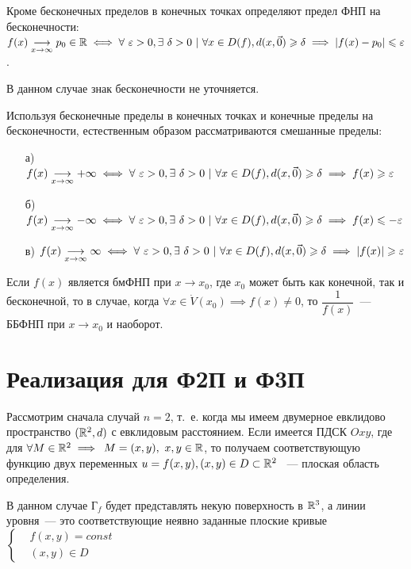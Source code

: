 \documentclass[../../main.tex]{subfiles}
\begin{document}
Кроме бесконечных пределов в конечных точках определяют предел ФНП
на бесконечности: $f(x)\underset{x \to \infty}{\longrightarrow}
p_0 \in \R \iff
\forall\ \eps > 0, \exists\ \delta > 0\ |\ 
\forall x \in D(f), d(x, \vec{0}) \geq \delta
\implies |f(x) - p_0| \leq \eps$.

В данном случае знак бесконечности не уточняется.

Используя бесконечные пределы в конечных точках и 
конечные пределы на бесконечности,
естественным образом рассматриваются смешанные пределы:

\begin{itemize}
	\item[а)] $f(x)\underset{x \to \infty}{\longrightarrow} +\infty \iff
	\forall\ \eps > 0, \exists\ \delta > 0\ |\ 
	\forall x \in D(f), d(x, \vec{0}) \geq \delta
	\implies f(x) \geq \eps$
	\item[б)] $f(x)\underset{x \to \infty}{\longrightarrow} -\infty \iff
	\forall\ \eps > 0, \exists\ \delta > 0\ |\ 
	\forall x \in D(f), d(x, \vec{0}) \geq \delta
	\implies f(x) \leq -\eps$
	\item[в)] $f(x)\underset{x \to \infty}{\longrightarrow} \infty \iff
	\forall\ \eps > 0, \exists\ \delta > 0\ |\ 
	\forall x \in D(f), d(x, \vec{0}) \geq \delta
	\implies |f(x)| \geq \eps$
\end{itemize}
	
Если $f(x)$ является бмФНП при $x \to x_0$, где $x_0$ может быть как конечной,
так и бесконечной, то в случае, когда $\forall x \in \dot{V}{(x_0)} \implies
f(x) \ne 0$, то $\dfrac{1}{f(x)}$~--- ББФНП при $x \to x_0$ и наоборот.
	
\section{Реализация для Ф2П и Ф3П}	

Рассмотрим сначала случай $n=2$, т.~е. когда мы имеем двумерное евклидово
пространство $(\mathbb{R}^2, d)$ с евклидовым расстоянием. Если 
имеется ПДСК $Oxy$, где для
$\forall M \in \mathbb{R}^2 \implies$
$M = (x, y),\ x, y \in \mathbb{R}$, то получаем
соответствующую функцию двух переменных 
$u = f(x, y), (x, y) \in D \subset \mathbb{R}^2$ ~---
плоская область определения.

В данном случае $\text{Г}_f$ будет представлять некую поверхность в $\mathbb{R}^3$,
а линии уровня~--- это соответствующие неявно заданные плоские кривые
$\left\{\begin{aligned}
	&f(x, y) = const \\
	&(x, y) \in D
\end{aligned}\right.$
\end{document}
